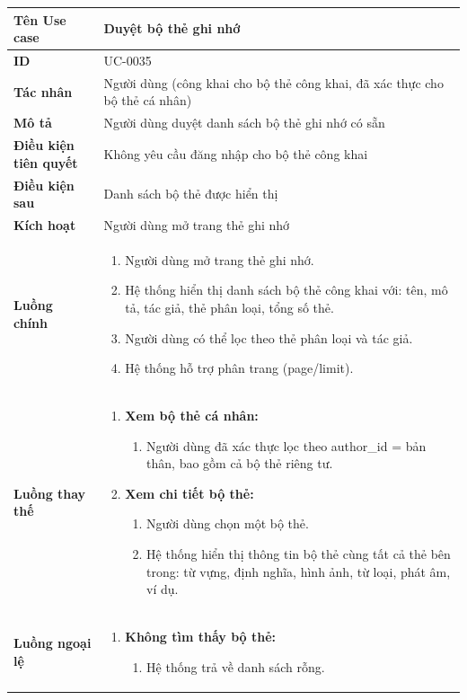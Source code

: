 {
\renewcommand{\arraystretch}{1.5}

\begin{tabularx}{\textwidth}{|>{\raggedright\arraybackslash}X|>{\raggedright\arraybackslash}X|}
\hline
\textbf{Tên Use case} & Duyệt bộ thẻ ghi nhớ \\
\hline
\textbf{ID} & UC-0035 \\
\hline
\textbf{Tác nhân} & Người dùng (công khai cho bộ thẻ công khai, đã xác thực cho bộ thẻ cá nhân) \\
\hline
\textbf{Mô tả} & Người dùng duyệt danh sách bộ thẻ ghi nhớ có sẵn \\
\hline
\textbf{Điều kiện tiên quyết} & Không yêu cầu đăng nhập cho bộ thẻ công khai \\
\hline
\textbf{Điều kiện sau} & Danh sách bộ thẻ được hiển thị \\
\hline
\textbf{Kích hoạt} & Người dùng mở trang thẻ ghi nhớ \\
\hline
\textbf{Luồng chính} &
\begin{enumerate}
    \item Người dùng mở trang thẻ ghi nhớ.
    \item Hệ thống hiển thị danh sách bộ thẻ công khai với: tên, mô tả, tác giả, thẻ phân loại, tổng số thẻ.
    \item Người dùng có thể lọc theo thẻ phân loại và tác giả.
    \item Hệ thống hỗ trợ phân trang (page/limit).
\end{enumerate} \\
\hline
\textbf{Luồng thay thế} &
\begin{enumerate}
    \item \textbf{Xem bộ thẻ cá nhân:}
    \begin{enumerate}
        \item[1A.] Người dùng đã xác thực lọc theo author\_id = bản thân, bao gồm cả bộ thẻ riêng tư.
    \end{enumerate}
    \item \textbf{Xem chi tiết bộ thẻ:}
    \begin{enumerate}
        \item[4A.] Người dùng chọn một bộ thẻ.
        \item[5A.] Hệ thống hiển thị thông tin bộ thẻ cùng tất cả thẻ bên trong: từ vựng, định nghĩa, hình ảnh, từ loại, phát âm, ví dụ.
    \end{enumerate}
\end{enumerate} \\
\hline
\textbf{Luồng ngoại lệ} &
\begin{enumerate}
    \item \textbf{Không tìm thấy bộ thẻ:}
    \begin{enumerate}
        \item[2Err.] Hệ thống trả về danh sách rỗng.
    \end{enumerate}
\end{enumerate} \\
\hline
\end{tabularx}
}
